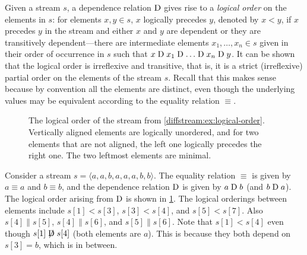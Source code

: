 Given a stream $s$, a dependence relation
$\mathrel{\mathrm{D}}$ gives rise to a \emph{logical order} on the elements in $s$:
for elements $x,y\in s$, $x$ logically precedes $y$, denoted by $x<y$,
if $x$ precedes $y$ in the stream and either $x$ and $y$ are dependent or they
are transitively dependent---there are intermediate elements $x_1, \ldots,
x_n\in s$ given in their order of occurrence in $s$ such that
$x\mathrel{\mathrm{D}} x_1 \mathrel{\mathrm{D}} \ldots \mathrel{\mathrm{D}} x_n \mathrel{\mathrm{D}} y$. It can be shown that the logical
order is irreflexive and transitive, that is, it is a strict (irreflexive) partial order
on the elements of the stream $s$.
Recall that this makes sense because by convention all the elements are distinct, even though the underlying values may be equivalent according to the equality relation $\equiv$.

\begin{figure}[t]
  \centering
  \caption{The logical order of the stream from \cref{diffstream:ex:logical-order}.
  Vertically aligned elements are logically unordered, and for two elements
  that are not aligned, the left one logically precedes
  the right one. The two leftmost elements are minimal.}
  \label{diffstream:fig:logical-order}
\end{figure}

\begin{example}\label{diffstream:ex:logical-order}
  Consider a stream $s=\langle a, a, b, a, a, a, b, b \rangle$.
  The equality relation $\equiv$
  is given by $a\equiv a$ and $b\equiv b$, and the dependence relation
  $\mathrel{\mathrm{D}}$ is given
  by $a \mathrel{\mathrm{D}} b$ (and $b \mathrel{\mathrm{D}} a$). The logical order arising from $\mathrel{\mathrm{D}}$ is shown in
  \cref{diffstream:fig:logical-order}. The logical orderings between elements
  include $s[1] < s[3]$, $s[3]<s[4]$, and $s[5]<s[7]$. Also $s[4]\parallel
  s[5]$, $s[4]\parallel s[6]$, and $s[5] \parallel s[6]$. Note that
  $s[1] < s[4]$ even though $s[1] \not\mathrel{\mathrm{D}} s[4]$ (both elements are $a$).
  This is because they both depend on $s[3]=b$, which is in between.
\end{example}

